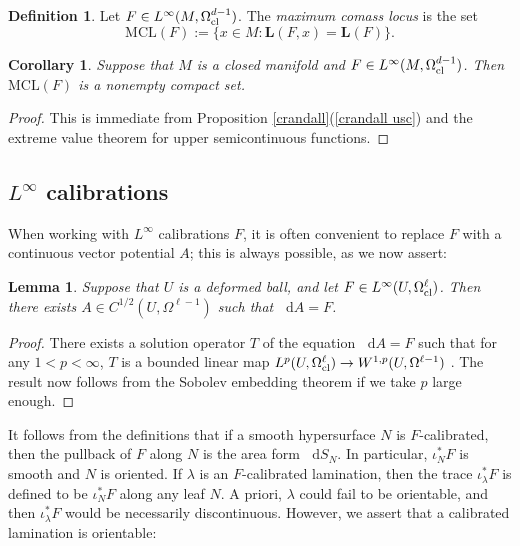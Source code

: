 \documentclass[reqno,11pt]{amsart}
\newcommand*\dif{\mathop{}\!\mathrm{d}}
\newcommand{\MCL}{\mathrm{MCL}}
\newcommand{\Comass}{\mathbf L}
\newcommand{\dfn}[1]{\emph{#1}\index{#1}}
\newtheorem{lemma}[theorem]{Lemma}
\newtheorem{corollary}[theorem]{Corollary}
\theoremstyle{definition}
\newtheorem{definition}[theorem]{Definition}
\numberwithin{equation}{section}
\begin{document}
\begin{definition}
Let $F \in L^\infty(M, \Omega^{d - 1}_{\rm cl})$.
The \dfn{maximum comass locus} is the set
$$\MCL(F) := \{x \in M: \Comass(F, x) = \Comass(F)\}.$$
\end{definition}

\begin{corollary}
Suppose that $M$ is a closed manifold and $F \in L^\infty(M, \Omega^{d - 1}_{\rm cl})$.
Then $\MCL(F)$ is a nonempty compact set.
\end{corollary}
\begin{proof}
This is immediate from Proposition \ref{crandall}(\ref{crandall usc}) and the extreme value theorem for upper semicontinuous functions.
\end{proof}

\subsection{\texorpdfstring{$L^\infty$}{L-infinity} calibrations}
When working with $L^\infty$ calibrations $F$, it is often convenient to replace $F$ with a continuous vector potential $A$; this is always possible, as we now assert:

\begin{lemma}\label{Hodge theorem}
Suppose that $U$ is a deformed ball, and let $F \in L^\infty(U, \Omega^\ell_{\rm cl})$.
Then there exists $A \in C^{1/2}(U, \Omega^{\ell - 1})$ such that $\dif A = F$.
\end{lemma}
\begin{proof}
There exists a solution operator $T$ of the equation $\dif A = F$ such that for any $1 < p < \infty$, $T$ is a bounded linear map $L^p(U, \Omega^\ell_{\rm cl}) \to W^{1, p}(U, \Omega^{\ell - 1})$ \cite{Costabel2010}.
The result now follows from the Sobolev embedding theorem if we take $p$ large enough.
\end{proof}

It follows from the definitions that if a smooth hypersurface $N$ is $F$-calibrated, then the pullback of $F$ along $N$ is the area form $\dif S_N$.
In particular, $\iota_N^* F$ is smooth and $N$ is oriented.
If $\lambda$ is an $F$-calibrated lamination, then the trace $\iota_\lambda^* F$ is defined to be $\iota_N^* F$ along any leaf $N$.
A priori, $\lambda$ could fail to be orientable, and then $\iota_\lambda^* F$ would be necessarily discontinuous.
However, we assert that a calibrated lamination is orientable:
\end{document}
